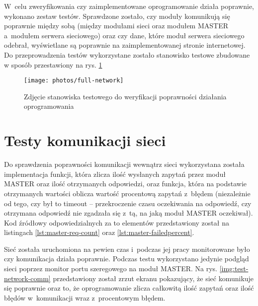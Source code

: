 W~celu zweryfikowania czy zaimplementowane oprogramowanie działa poprawnie, wykonano zestaw testów. Sprawdzone zostało,
czy moduły komunikują się poprawnie między sobą (między modułami sieci oraz modułem MASTER a~modułem serwera sieciowego)
oraz czy dane, które moduł serwera sieciowego odebrał, wyświetlane są poprawnie na zaimplementowanej stronie
internetowej. Do przeprowadzenia testów wykorzystane zostało stanowisko testowe zbudowane w sposób przestawiony na rys.
\ref{img:full-network}

\begin{figure}[!htbp]
    \centering
    \texttt{[image: photos/full-network]}
    \caption{\label{img:full-network}Zdjęcie stanowiska testowego do weryfikacji poprawności działania oprogramowania}
\end{figure}

\section{\label{sect:test-network-comm}Testy komunikacji sieci} Do sprawdzenia poprawności komunikacji wewnątrz sieci
wykorzystana została implementacja funkcji, która zlicza ilość wysłanych zapytań przez moduł MASTER oraz ilość
otrzymanych odpowiedzi, oraz funkcja, która na podstawie otrzymanych wartości oblicza wartość procentową zapytań z~błędem
(niezależnie od tego, czy był to timeout -- przekroczenie czasu oczekiwania na odpowiedź, czy otrzymana odpowiedź nie
zgadzała się z~tą, na jaką moduł MASTER oczekiwał). Kod źródłowy odpowiedzialnych za to elementów przedstawiony został
na listingach \ref{lst:master-req-count} oraz \ref{lst:master-failedpercent}.





Sieć została uruchomiona na pewien czas i~podczas jej pracy monitorowane było czy komunikacja działa poprawnie. Podczas
testu wykorzystano jedynie podgląd sieci poprzez monitor portu szeregowego na moduł MASTER. Na rys.
\ref{img:test-network-comm} przedstawiony został zrzut ekranu pokazujący, że sieć komunikuje się poprawnie oraz to, że
oprogramowanie zlicza całkowitą ilość zapytań oraz ilość błędów w~komunikacji wraz z~procentowym błędem.

